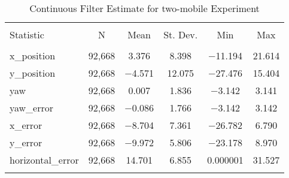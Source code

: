
\begin{table}[h] \centering 
  \caption{Continuous Filter Estimate for two-mobile Experiment} 
  \label{tab:two_mobile_continuous_summary} 
\begin{tabular}{@{\extracolsep{5pt}}lccccc} 
\\[-1.8ex]\hline 
\hline \\[-1.8ex] 
Statistic & \multicolumn{1}{c}{N} & \multicolumn{1}{c}{Mean} & \multicolumn{1}{c}{St. Dev.} & \multicolumn{1}{c}{Min} & \multicolumn{1}{c}{Max} \\ 
\hline \\[-1.8ex] 
x\_position & 92,668 & 3.376 & 8.398 & $-$11.194 & 21.614 \\ 
y\_position & 92,668 & $-$4.571 & 12.075 & $-$27.476 & 15.404 \\ 
yaw & 92,668 & 0.007 & 1.836 & $-$3.142 & 3.141 \\ 
yaw\_error & 92,668 & $-$0.086 & 1.766 & $-$3.142 & 3.142 \\ 
x\_error & 92,668 & $-$8.704 & 7.361 & $-$26.782 & 6.790 \\ 
y\_error & 92,668 & $-$9.972 & 5.806 & $-$23.178 & 8.970 \\ 
horizontal\_error & 92,668 & 14.701 & 6.855 & 0.000001 & 31.527 \\ 
\hline \\[-1.8ex] 
\end{tabular} 
\end{table} 
